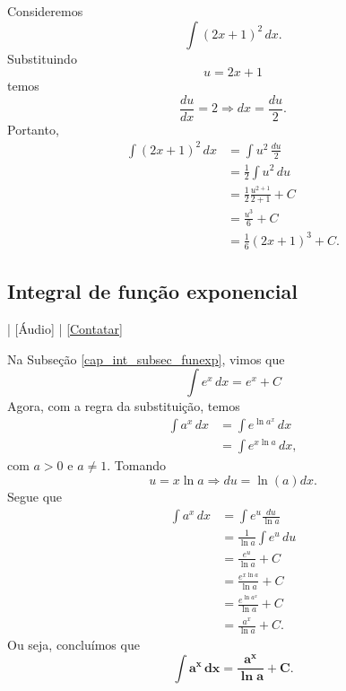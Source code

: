 \begin{ex}
  Consideremos
  \begin{equation}
    \int (2x+1)^2\,dx.
  \end{equation}
  Substituindo
  \begin{equation}
    u = 2x+1
  \end{equation}
  temos
  \begin{equation}
    \frac{du}{dx} = 2 \Rightarrow dx = \frac{du}{2}.
  \end{equation}
  Portanto,
  \begin{align}
    \int (2x+1)^2\,dx &= \int u^2\,\frac{du}{2}\\
                     &= \frac{1}{2}\int u^2\,du\\
                     &= \frac{1}{2}\frac{u^{2+1}}{2+1} + C\\
                     &= \frac{u^3}{6} + C\\
                     &= \frac{1}{6}(2x+1)^3 + C.
  \end{align}
\end{ex}


\subsection{Integral de função exponencial}

\begin{flushright}
  [Vídeo] | [Áudio] | \href{https://phkonzen.github.io/notas/contato.html}{[Contatar]}
\end{flushright}

Na Subseção \ref{cap_int_subsec_funexp}, vimos que
\begin{equation}
  \int e^x\,dx = e^x + C
\end{equation}
Agora, com a regra da substituição, temos
\begin{align}
  \int a^x\,dx &= \int e^{\ln a^x}\,dx \\
               &= \int e^{x\ln a}\,dx,
\end{align}
com $a>0$ e $a\neq 1$. Tomando
\begin{equation}
  u = x\ln a \Rightarrow du = \ln(a)dx.
\end{equation}
Segue que
\begin{align}
  \int a^x\,dx &= \int e^u\frac{du}{\ln a} \\
               &= \frac{1}{\ln a}\int e^u\,du \\
               &= \frac{e^u}{\ln a} + C \\
               &= \frac{e^{x\ln a}}{\ln a} + C \\
               &= \frac{e^{\ln a^x}}{\ln a} + C \\
               &= \frac{a^x}{\ln a} + C.
\end{align}
Ou seja, concluímos que
\begin{equation}
  \pmb{\int a^x\,dx = \frac{a^x}{\ln a} + C}.
\end{equation}

